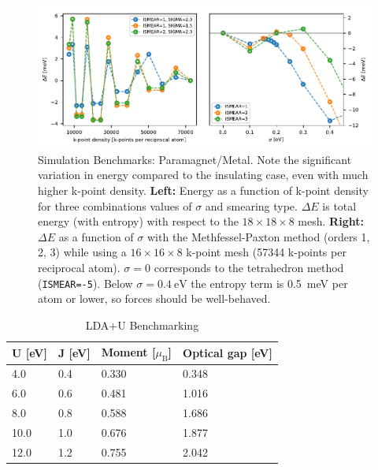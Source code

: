 \begin{figure}
    \centering
    \includegraphics{fig/simulation/convergence_metal.pdf}
    \caption[Simulation Benchmarks: Paramagnet/Metal]{Simulation Benchmarks: Paramagnet/Metal. Note the significant variation in energy compared to the insulating case, even with much higher k-point density. \textbf{Left:} Energy as a function of k-point density for three combinations values of $\sigma$ and smearing type. $\Delta E$ is total energy (with entropy) with respect to the $18 \times 18 \times 8$ mesh. \textbf{Right:} $\Delta E$ as a function of $\sigma$ with the Methfessel-Paxton method (orders 1, 2, 3) while using a $16 \times 16 \times 8$ k-point mesh (57344 k-points per reciprocal atom). $\sigma=0$ corresponds to the tetrahedron method (\texttt{ISMEAR=-5}). Below $\sigma = \SI{0.4}{\eV}$ the entropy term is \SI{0.5}{\milli\eV} per atom or lower, so forces should be well-behaved.}
    \label{fig:sim_bench_para}
\end{figure}

\begin{table}[b]
    \centering
    \begin{tabular}{@{}llll@{}}
    \toprule
    U [eV] & J [eV] & Moment [$\mu_\text{B}$] & Optical gap [eV] \\ \midrule
    4.0    & 0.4    & 0.330       & 0.348    \\
    6.0    & 0.6    & 0.481       & 1.016    \\
    8.0    & 0.8    & 0.588       & 1.686    \\
    10.0   & 1.0    & 0.676       & 1.877    \\
    12.0   & 1.2    & 0.755       & 2.042    \\ \bottomrule
    \end{tabular}
    \caption[LDA+U Benchmarking]{LDA+U Benchmarking}
    \label{tab:ldau}
\end{table}

